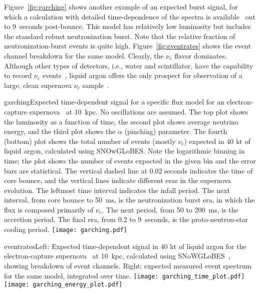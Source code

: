 Figure~\ref{fig:garching} shows another example of an expected burst
signal, for which a calculation with detailed time-dependence of the
spectra is available~\cite{Huedepohl:2009wh} out to 9~seconds
post-bounce.  This model has relatively low luminosity but includes the standard robust
neutronization burst.   Note that the relative fraction of
neutronization-burst events is quite high.
Figure~\ref{fig:eventrates} shows the event channel breakdown for the same model.  Clearly, the $\nu_e$
flavor dominates.  Although other types of detectors, i.e., water and scintillator, have the capability to record $\nu_e$ events~\cite{Laha:2013hva,Laha:2014yua}, liquid argon offers the only prospect for observation of a large, clean supernova $\nu_e$ sample~\cite{Scholberg:2012id}.


\begin{cdrfigure}{garching}{Expected
  time-dependent signal for a specific flux model for an
  electron-capture supernova~\cite{Huedepohl:2009wh} at 10~kpc.  No oscillations are assumed. The
  top plot shows the luminosity as a function of time, the second plot
  shows average neutrino energy, and the third plot shows the $\alpha$
  (pinching) parameter.  The fourth (bottom) plot shows the total number of
  events (mostly $\nu_e$) expected in 40 kt of liquid argon, calculated using
  SNOwGLoBES.  Note the logarithmic binning in time; the plot shows
  the number of events expected in the given bin and the error bars
  are statistical. The vertical dashed line at 0.02 seconds indicates
  the time of core bounce, and the vertical lines indicate different
  eras in the supernova evolution.  The leftmost time interval
  indicates the infall period.  The next interval, from core bounce to
  50~ms, is the neutronization burst era, in which the flux is
  composed primarily of $\nu_e$.  The next period, from 50 to 200~ms,
  is the accretion period. The final era, from 0.2 to 9~seconds, is
  the proto-neutron-star cooling period.}
\texttt{[image: garching.pdf]}
\end{cdrfigure}


\begin{cdrfigure}{eventrates}{Left: Expected
  time-dependent signal in 40 kt of liquid argon for the electron-capture supernova~\cite{Huedepohl:2009wh} at 10~kpc, calculated using SNoWGLoBES~\cite{snowglobes}, showing breakdown of event channels.  Right: expected measured event spectrum for the same model, integrated over time.}
\texttt{[image: garching\_time\_plot.pdf]}
\texttt{[image: garching\_energy\_plot.pdf]}
\end{cdrfigure}

